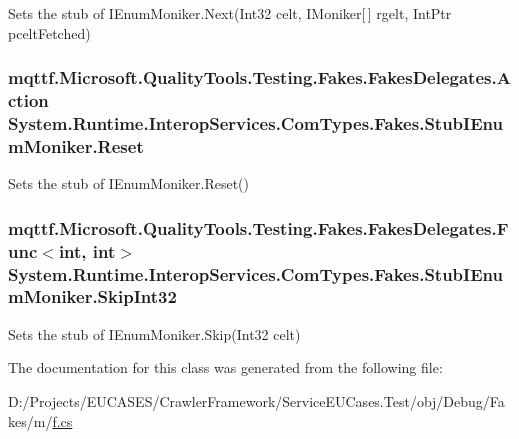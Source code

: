 Sets the stub of I\-Enum\-Moniker.\-Next(\-Int32 celt, I\-Moniker\mbox{[}$\,$\mbox{]} rgelt, Int\-Ptr pcelt\-Fetched)

\hypertarget{class_system_1_1_runtime_1_1_interop_services_1_1_com_types_1_1_fakes_1_1_stub_i_enum_moniker_a81fc38550a5fb2167a83ec2d1ed9298c}{
\subsubsection[{Reset}]{\setlength{\rightskip}{0pt plus 5cm}mqttf.\-Microsoft.\-Quality\-Tools.\-Testing.\-Fakes.\-Fakes\-Delegates.\-Action System.\-Runtime.\-Interop\-Services.\-Com\-Types.\-Fakes.\-Stub\-I\-Enum\-Moniker.\-Reset}}\label{class_system_1_1_runtime_1_1_interop_services_1_1_com_types_1_1_fakes_1_1_stub_i_enum_moniker_a81fc38550a5fb2167a83ec2d1ed9298c}


Sets the stub of I\-Enum\-Moniker.\-Reset()

\hypertarget{class_system_1_1_runtime_1_1_interop_services_1_1_com_types_1_1_fakes_1_1_stub_i_enum_moniker_a313c803c67b41e82c96affab3b56ce30}{
\subsubsection[{Skip\-Int32}]{\setlength{\rightskip}{0pt plus 5cm}mqttf.\-Microsoft.\-Quality\-Tools.\-Testing.\-Fakes.\-Fakes\-Delegates.\-Func$<$int, int$>$ System.\-Runtime.\-Interop\-Services.\-Com\-Types.\-Fakes.\-Stub\-I\-Enum\-Moniker.\-Skip\-Int32}}\label{class_system_1_1_runtime_1_1_interop_services_1_1_com_types_1_1_fakes_1_1_stub_i_enum_moniker_a313c803c67b41e82c96affab3b56ce30}


Sets the stub of I\-Enum\-Moniker.\-Skip(\-Int32 celt)



The documentation for this class was generated from the following file\-:\begin{DoxyCompactItemize}
\item 
D\-:/\-Projects/\-E\-U\-C\-A\-S\-E\-S/\-Crawler\-Framework/\-Service\-E\-U\-Cases.\-Test/obj/\-Debug/\-Fakes/m/\hyperlink{m_2f_8cs}{f.\-cs}\end{DoxyCompactItemize}
